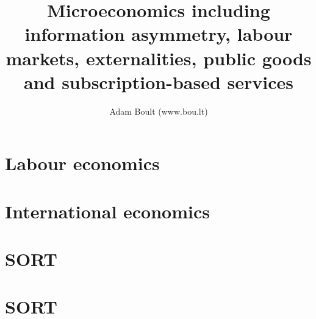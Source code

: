 \documentclass[oneside]{book}
\begin{document}
\author{Adam Boult (www.bou.lt)}
\title{Microeconomics including information asymmetry, labour markets, externalities, public goods and subscription-based services}
\maketitle

\setcounter{tocdepth}{0}
\tableofcontents



\part{Labour economics}



\part{International economics}



\part{SORT}




\part{SORT}

\end{document}
